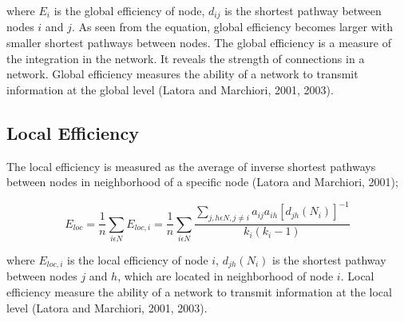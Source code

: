 \documentclass[12pt]{article}
\begin{document}
where $E_i$ is the global efficiency of node, $d_{ij}$ is the shortest pathway between nodes $i$ and $j$. As seen from the equation, global efficiency becomes larger with smaller shortest pathways between nodes. The global efficiency is a measure of the integration in the network. It reveals the strength of connections in a network. Global efficiency measures the ability of a network to transmit information at the global level (Latora and Marchiori, 2001, 2003).

%
%
%
%
%
%
%
% 
%
%
\subsection{Local Efficiency}
The local efficiency is measured as the average of inverse shortest pathways between nodes in neighborhood of a specific node (Latora and Marchiori, 2001);

\begin{equation}
E_{loc} = \frac{1}{n}\sum\limits_{i \epsilon N} E_{loc,i} = \frac{1}{n}\sum\limits_{i \epsilon N} \frac{\sum\limits_{j,h \epsilon N, j\neq i} a_{ij} a_{ih}[d_{jh}(N_i)]^{-1}}{k_i(k_i - 1) }
\end{equation}

where $E_{loc,i}$ is the local efficiency of node $i$, $d_{jh}(N_i)$ is the shortest pathway between nodes $j$ and $h$, which are located in neighborhood of node $i$. Local efficiency measure the ability of a network to transmit information at the local level (Latora and Marchiori, 2001, 2003).
\end{document}
